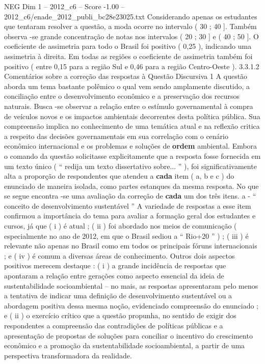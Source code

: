 \begin{textsample}{NEG Dim 1 – 2012\_c6 – Score -1.00 – 2012\_c6/enade\_2012\_publi\_bc28e23025.txt}
Considerando apenas os estudantes que tentaram resolver a questão, a moda ocorre no intervalo ( 30 ; 40 ].
Também observa -se grande concentração de notas nos intervalos ( 20 ; 30 ] e ( 40 ; 50 ].
O coeficiente de assimetria para todo o Brasil foi positivo ( 0,25 ), indicando uma assimetria à direita.
Em todas as regiões o coeficiente de assimetria também foi positivo ( entre 0,15 para a região Sul e 0,46 para a região Centro-Oeste ). 3.3.1.2 Comentários sobre a correção das respostas à Questão Discursiva 1 A questão aborda um tema bastante polêmico o qual vem sendo amplamente discutido, a conciliação entre o desenvolvimento econômico e a preservação dos recursos naturais.
Busca -se observar a relação entre o estímulo governamental à compra de veículos novos e os impactos ambientais decorrentes desta política pública.
Sua compreensão implica no conhecimento de uma temática atual e na reflexão critica a respeito das decisões governamentais em sua correlação com o cenário econômico internacional e os problemas e soluções de \textbf{ordem} ambiental.
Embora o comando da questão solicitasse explicitamente que a resposta fosse fornecida em um texto único ( “ redija um texto dissertativo sobre... ” ), foi significativamente alta a proporção de respondentes que atendeu a \textbf{cada} item ( a, b e c ) do enunciado de maneira isolada, como partes estanques da mesma resposta.
No que se segue encontra -se uma avaliação da correção de \textbf{cada} um dos três itens. a - “ conceito de desenvolvimento sustentável ” A variedade de respostas a esse item confirmou a importância do tema para avaliar a formação geral dos estudantes e cursos, já que ( i ) é atual ; ( ii ) foi abordado nos meios de comunicação ( especialmente no ano de 2012, em que o Brasil sediou a “ Rio+20 ” ) ; ( iii ) é relevante não apenas no Brasil como em todos os principais fóruns internacionais ; e ( iv ) é comum a diversas áreas de conhecimento.
Outros dois aspectos positivos merecem destaque : ( i ) a grande incidência de respostas que apontaram a relação entre gerações como aspecto essencial da ideia de sustentabilidade socioambiental – no mais, as respostas apresentaram pelo menos a tentativa de indicar uma definição de desenvolvimento sustentável ou a abordagem positiva dessa mesma noção, evidenciado compreensão do enunciado ; e ( ii ) o exercício crítico que a questão propunha, no sentido de exigir dos respondentes a compreensão das contradições de políticas públicas e a apresentação de propostas de soluções para conciliar o incentivo do crescimento econômico e a promoção da sustentabilidade socioambiental, a partir de uma perspectiva transformadora da realidade.

\end{textsample}
